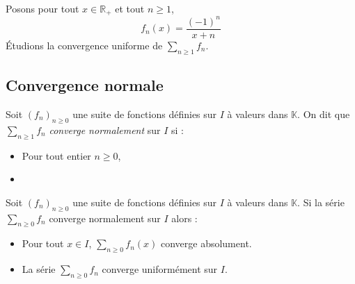 \documentclass[french,11pt,twoside]{VcCours}
\begin{document}
\begin{Exemple} Posons pour tout $x \in \mathbb{R}_+$ et tout $n \geq 1$, 
$$ f_n(x) = \frac{(-1)^n}{x+n}$$
Étudions la convergence uniforme de $\sum_{n \geq 1} f_n$.

%
%
%
%
%
%

\vspace*{10.2cm}
\end{Exemple}

\subsection{Convergence normale}

\begin{Definition}{} Soit $(f_n)_{n \geq 0}$ une suite de fonctions définies sur $I$ à valeurs dans $\mathbb{K}$. On dit que $\sum_{n \geq 1} f_n$ \emph{converge normalement} sur $I$ si :

\begin{itemize}
\item Pour tout entier $n \geq 0$, \phantom{$f_n$ est bornée sur $I$.}
\item {}
\end{itemize}
\end{Definition}

\begin{Theoreme}{} Soit $(f_n)_{n \geq 0}$ une suite de fonctions définies sur $I$ à valeurs dans $\mathbb{K}$. Si la série $\sum_{n \geq 0} f_n$ converge normalement sur $I$ alors :

\begin{itemize}
\item Pour tout $x \in I$, $\sum_{n \geq 0} f_n(x)$ converge absolument.
\item La série $\sum_{n \geq 0} f_n$ converge uniformément sur $I$.
\end{itemize}
\end{Theoreme}
\end{document}
